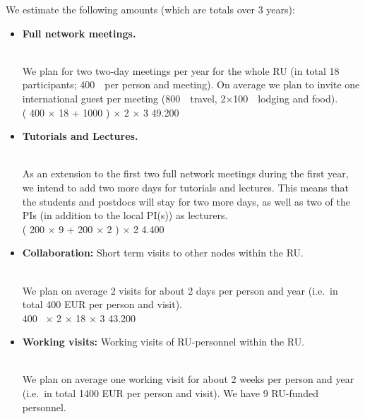 \documentclass[10pt,fleqn,twoside]{article}
\begin{document}
We estimate the following amounts (which are totals over 3 years):


\begin{itemize}
\item
\begin{Emphasize}
{\bf Full network meetings.}
\end{Emphasize}\\
We plan for two two-day meetings per year for the whole RU (in total 18
participants; 400~\EUR{}\ per person and meeting). On average we plan to 
invite one international guest per meeting (800~\EUR{}\ travel, 2$\times$100~\EUR{}\ 
lodging and food).\vspace{0.2em}\\
( 400 \EUR{} $\times$ 18 +  1000 \EUR{} ) $\times$ 2 $\times$ 3  \hfill 49.200~\EUR{}\\
\item
\begin{Emphasize}
{\bf Tutorials and Lectures.}
\end{Emphasize}\\
As an extension to the first two full network meetings during the first year, we
intend to add two more days for tutorials and lectures. This means that the
students and postdocs will stay for two more days, as well as two of the PIs
(in addition to the local PI(s)) as lecturers.
\vspace{0.2em}\\
( 200 \EUR{} $\times$ 9 + 200 \EUR{} $\times$ 2 ) $\times$ 2  \hfill 4.400~\EUR{}\\
\item 
\begin{Emphasize}
{\bf Collaboration:} Short term visits to other nodes within the RU.
\end{Emphasize}\\
We plan on average 2 visits for about 2 days per person and year
(i.e.\ in total 400 EUR per person and visit).
\vspace{0.2em}\\
400~\EUR{} $\times$ 2 $\times$ 18 $\times$ 3    \hfill 43.200~\EUR{}\\
\item 
\begin{Emphasize}
{\bf Working visits:} Working visits of RU-personnel within the RU.
\end{Emphasize}\\
We plan on average one working visit for about 2 weeks per person and year
(i.e.\ in total 1400 EUR per person and visit). We have 9 RU-funded personnel.

\end{itemize}
\end{document}
